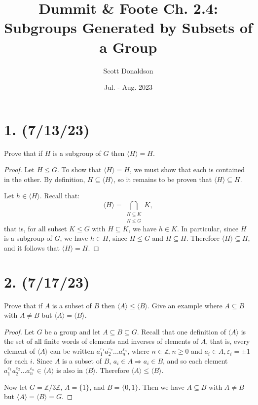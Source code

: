 \documentclass{article}
\title{Dummit \& Foote Ch. 2.4: Subgroups Generated by Subsets of a Group}
\author{Scott Donaldson}
\date{Jul. - Aug. 2023}
\begin{document}
\maketitle

\section*{1. (7/13/23)}

Prove that if $H$ is a subgroup of $G$ then $\langle H \rangle = H$.

\begin{proof}
    Let $H \leq G$. To show that $\langle H \rangle = H$, we must show that each is contained in the other. By definition, $H \subseteq \langle H \rangle$, so it remains to be proven that $\langle H \rangle \subseteq H$.

    Let $h \in \langle H \rangle$. Recall that:
    \begin{equation*}
        \langle H \rangle = \bigcap_{\substack{H \subseteq K \\ K \leq G}} K,
    \end{equation*}
    that is, for all subset $K \leq G$ with $H \subseteq K$, we have $h \in K$. In particular, since $H$ is a subgroup of $G$, we have $h \in H$, since $H \leq G$ and $H \subseteq H$. Therefore $\langle H \rangle \subseteq H$, and it follows that $\langle H \rangle = H$.
\end{proof}

\section*{2. (7/17/23)}

Prove that if $A$ is a subset of $B$ then $\langle A \rangle \leq \langle B \rangle$. Give an example where $A \subseteq B$ with $A \neq B$ but $\langle A \rangle = \langle B \rangle$.

\begin{proof}
    Let $G$ be a group and let $A \subseteq B \subseteq G$. Recall that one definition of $\langle A \rangle$ is the set of all finite words of elements and inverses of elements of $A$, that is, every element of $\langle A \rangle$ can be written $a_1^{\varepsilon_1} a_2^{\varepsilon_2} ... a_n^{\varepsilon_n}$, where $n \in \mathbb{Z}, n \geq 0$ and $a_i \in A, \varepsilon_i = \pm 1$ for each $i$. Since $A$ is a subset of $B$, $a_i \in A \Rightarrow a_i \in B$, and so each element $a_1^{\varepsilon_1} a_2^{\varepsilon_2} ... a_n^{\varepsilon_n} \in \langle A \rangle$ is also in $\langle B \rangle$. Therefore $\langle A \rangle \leq \langle B \rangle$.

    Now let $G = \mathbb{Z}/3\mathbb{Z}$, $A = \{ 1 \}$, and $B = \{ 0, 1 \}$. Then we have $A \subseteq B$ with $A \neq B$ but $\langle A \rangle = \langle B \rangle = G$.
\end{proof}
\end{document}
